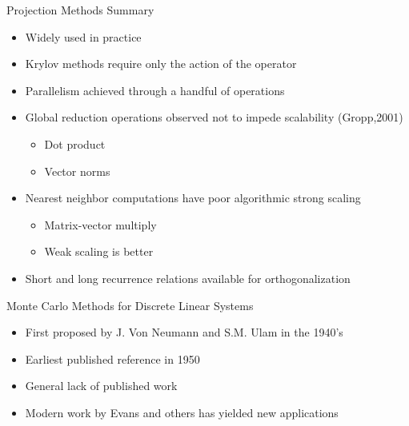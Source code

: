 \documentclass{beamer}
\begin{document}
\begin{frame}{Projection Methods Summary}

  \begin{itemize}
  \item Widely used in practice
  \item Krylov methods require only the action of the operator
  \item Parallelism achieved through a handful of operations
  \item Global reduction operations observed not to impede scalability
    (Gropp,2001)
    \begin{itemize}
    \item Dot product
    \item Vector norms
    \end{itemize}
  \item Nearest neighbor computations have poor algorithmic strong
    scaling
    \begin{itemize}
    \item Matrix-vector multiply
    \item Weak scaling is better
    \end{itemize}
  \item Short and long recurrence relations available for
    orthogonalization
  \end{itemize}

\end{frame}

\begin{frame}{Monte Carlo Methods for Discrete Linear Systems}

  \begin{itemize}
  \item First proposed by J. Von Neumann and S.M. Ulam in the 1940's
  \item Earliest published reference in 1950
  \item General lack of published work
  \item Modern work by Evans and others has yielded new applications
  \end{itemize}
\end{frame}
\end{document}
